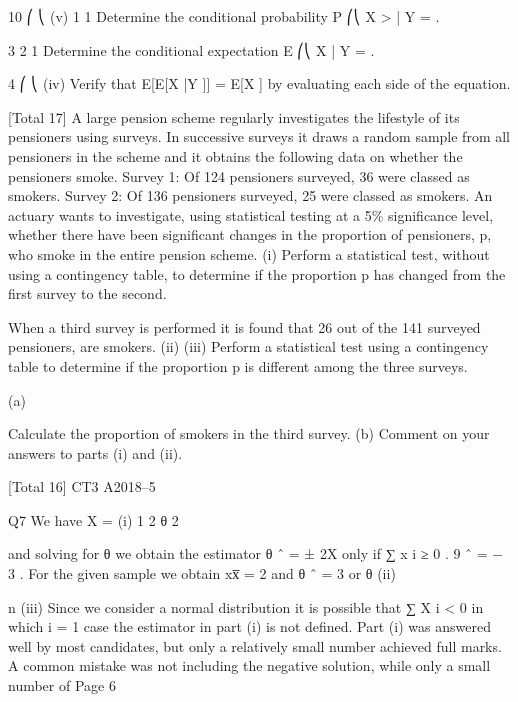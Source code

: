 \documentclass[a4paper,12pt]{article}
\begin{document}
\begin{enumerate}
10
⎛
⎝
(v)
1
1
Determine the conditional probability P ⎛⎝ X > | Y = .

3
2
1
Determine the conditional expectation E ⎛⎝ X | Y = .

4   
⎛
⎝
(iv)
Verify that E[E[X |Y ]] = E[X ] by evaluating each side of the equation.


[Total 17]
A large pension scheme regularly investigates the lifestyle of its pensioners using surveys. In successive surveys it draws a random sample from all pensioners in the
scheme and it obtains the following data on whether the pensioners smoke.
Survey 1: Of 124 pensioners surveyed, 36 were classed as smokers.
Survey 2: Of 136 pensioners surveyed, 25 were classed as smokers.
An actuary wants to investigate, using statistical testing at a 5\% significance level,
whether there have been significant changes in the proportion of pensioners, p, who
smoke in the entire pension scheme.
(i)
Perform a statistical test, without using a contingency table, to determine if the
proportion p has changed from the first survey to the second.


When a third survey is performed it is found that 26 out of the 141 surveyed
pensioners, are smokers.
(ii)
(iii)
Perform a statistical test using a contingency table to determine if the
proportion p is different among the three surveys.

(a)

Calculate the proportion of smokers in the third survey.
(b)
Comment on your answers to parts (i) and (ii).




[Total 16]
CT3 A2018–5 

Q7
We have X =
(i)
1 2
θ
2

and solving for θ we obtain the estimator θ ˆ = ± 2X 
only if ∑ x i ≥ 0 . 
9
ˆ = − 3 .
For the given sample we obtain xx̅ = 2 and θ ˆ = 3 or θ
(ii)

n
(iii)
Since we consider a normal distribution it is possible that
∑ X i < 0 in which
i = 1
case the estimator in part (i) is not defined.
Part (i) was answered well by most candidates, but only a relatively
small number achieved full marks. A common mistake was not
including the negative solution, while only a small number of
Page 6


\end{enumerate}
\end{document}
